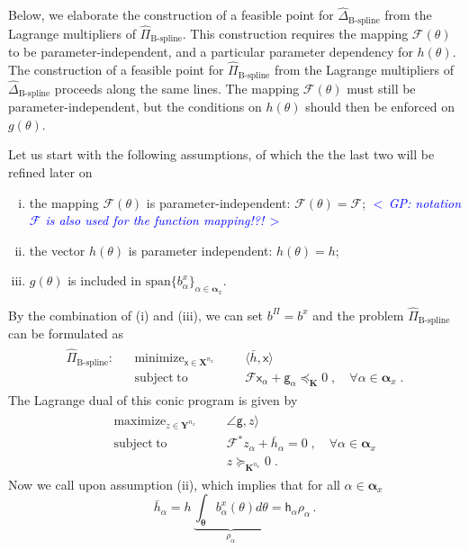 \documentclass{article}
\DeclareMathOperator*{\minimize}{minimize}
\DeclareMathOperator*{\maximize}{maximize}
\DeclareMathOperator*{\subj}{subject\;to}
\newcommand{\commentGP}[1]{\noindent \textcolor{blue}{\emph{$<\,$GP: #1$\,>$}}}%
\newcommand{\ppar}{\theta}                          %
\newcommand{\Ppar}{{\bm{\theta}}}                   %
\newcommand{\X}{\mathbf{X}}                         %
\newcommand{\Y}{\mathbf{Y}}                         %
\newcommand{\K}{\mathbf{K}}                         %
\newcommand{\calF}{\mathcal{F}}                     %
\newcommand{\bx}{b^x}               %
\newcommand{\bxa}{\bx_\alpha}       %
\newcommand{\cx}{\textsf{x}}        %
\newcommand{\nx}{{n_x}}             %
\newcommand{\Alpha}{\bm{\alpha}}    %
\newcommand{\meanh}{\bar{h}}        %
\newcommand{\meanha}{\meanh_\alpha} %
\newcommand{\bPi}{b^\Pi}                %
\newcommand{\cg}{\textsf{g}}            %
\newcommand{\cha}{\textsf{h}_\alpha}    %
\begin{document}
Below, we elaborate the construction of a feasible point for $\hat{\Delta}_{\text{B-spline}}$ from the Lagrange multipliers of $\hat{\Pi}_{\text{B-spline}}$. This construction requires the mapping $\calF(\ppar)$ to be parameter-independent, and a particular parameter dependency for $h(\ppar)$. The construction of a feasible point for $\hat{\Pi}_{\text{B-spline}}$ from the Lagrange multipliers of $\hat{\Delta}_{\text{B-spline}}$ proceeds along the same lines. The mapping $\calF(\ppar)$ must still be parameter-independent, but the conditions on $h(\ppar)$ should then be enforced on $g(\ppar)$.


Let us start with the following assumptions, of which the the last two will be refined later on
\begin{enumerate}[(i)]
\item the mapping $\calF(\ppar)$ is parameter-independent: $\calF(\ppar)=\calF$; \commentGP{notation $\calF$ is also used for the function mapping!?!}
\item the vector $h(\ppar)$ is parameter independent: $h(\ppar)=h$;
\item $g(\ppar)$ is included in $\text{span}\{\bxa\}_{\alpha\in\Alpha_x}$.
\end{enumerate}
By the combination of (i) and (iii), we can set $\bPi=\bx$ and the problem $\hat{\Pi}_\text{B-spline}$ can be formulated as
\begin{gather*}
\begin{aligned}
\hat{\Pi}_\text{B-spline}: && \minimize_{\cx\in\X^\nx} &&& \langle \meanh, \cx \rangle    \\%
                           && \subj                      &&& \calF \cx_\alpha + \cg_\alpha \preceq_\K 0 \;, \quad \forall \alpha\in \Alpha_x\;.%
\end{aligned}
\end{gather*}
The Lagrange dual of this conic program is given by
\begin{gather}\label{eq:Bprog_primal_dualized}
\begin{aligned}
 && \maximize_{z\in\Y^\nx} &&& \angle \cg, z \rangle    \\%
 && \subj                    &&& \calF^* z_\alpha +  \meanha = 0 \;, \quad \forall \alpha\in \Alpha_x\\%
 &&                          &&& z \succeq_{\K^\nx} 0 \;.%
\end{aligned}
\end{gather}
Now we call upon assumption (ii), which implies that for all $\alpha\in\Alpha_x$
\begin{equation}\label{eq:ass_h}
\meanha = h \, \underbrace{\int_\Ppar \bxa(\ppar)d\ppar}_{\rho_\alpha} = \cha \rho_\alpha \,.%
\end{equation}
\end{document}
